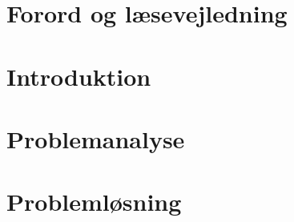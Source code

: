 



\frontmatter

 \clearpage 
\chapter*{Forord og læsevejledning}

\newpage

\tableofcontents*

\mainmatter

\chapter{Introduktion}\vspace{-.75cm}



\chapter{Problemanalyse}\vspace{-.75cm}









\chapter{Problemløsning}\vspace{-.75cm}


\begingroup
\raggedright


\endgroup

\begin{appendices}
\end{appendices}



